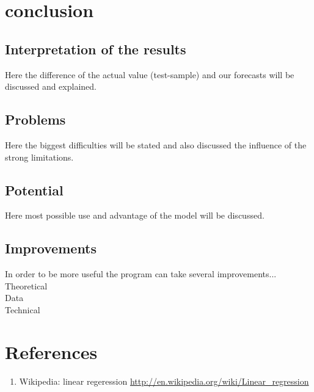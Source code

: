 \documentclass {article}
\begin{document}
\newpage
\section{conclusion}
\subsection{Interpretation of the results}
Here the difference of the actual value (test-sample) and our forecasts will be discussed and explained.
\subsection{Problems}
Here the biggest difficulties will be stated and also discussed the influence of the strong limitations.
\subsection{Potential}
Here most possible use and advantage of the model will be discussed.
\subsection{Improvements}
In order to be more useful the program can take several improvements...\\
Theoretical\\
Data\\
Technical

\newpage
\section{References}
\begin{enumerate}
	\item Wikipedia: linear regeression \url{http://en.wikipedia.org/wiki/Linear_regression}
\end{enumerate}
\end{document}
